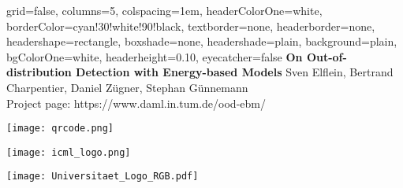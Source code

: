 \documentclass[landscape,a0paper,fontscale=0.30]{baposter}
\begin{document}
\begin{poster}{
 grid=false,
 columns=5,
 colspacing=1em,
 headerColorOne=white,
 borderColor=cyan!30!white!90!black,
 textborder=none,
 headerborder=none,
 headershape=rectangle,
 boxshade=none,
 headershade=plain,
 background=plain,
 bgColorOne=white,
 headerheight=0.10\textheight,
 eyecatcher=false}
 {
 }
 {\huge\bf On Out-of-distribution Detection with Energy-based Models}
 {Sven Elflein, Bertrand Charpentier, Daniel Z\"ugner, Stephan G\"unnemann \\
 Project page: {\color{blue}https://www.daml.in.tum.de/ood-ebm/}}
 {
    \begin{minipage}[c]{0.06\textwidth}
    \texttt{[image: qrcode.png]}
    \end{minipage}
    \makebox[0.02\textwidth]{} 
    \begin{minipage}[c]{0.15\textwidth}
    \texttt{[image: icml\_logo.png]}
    \end{minipage}
    \makebox[0.02\textwidth]{} 
    \begin{minipage}[c]{0.09\textwidth}
        \texttt{[image: Universitaet\_Logo\_RGB.pdf]}
    \end{minipage}
 }


\end{poster}
\end{document}
